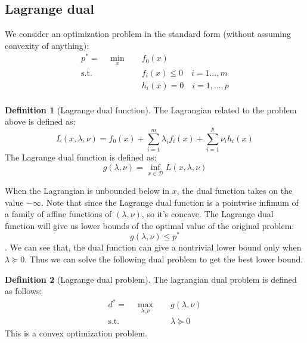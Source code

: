 \documentclass[
]{book}
\theoremstyle{definition}
\newtheorem{definition}{Definition}[chapter]
\theoremstyle{definition}
\theoremstyle{definition}
\theoremstyle{definition}
\theoremstyle{remark}
\begin{document}
\subsection{Lagrange dual}\label{lagrange-dual}

We consider an optimization problem in the standard form (without assuming convexity of anything):
\begin{equation}
\begin{aligned}
p^* = \quad \min_{x} \quad & f_0(x)\\
\textrm{s.t.} \quad & f_i(x)\leq 0\quad i=1...,m\\
  & h_i(x) = 0\quad i=1,...,p   \\
\end{aligned}
\end{equation}

\begin{definition}[Lagrange dual function]
\protect\hypertarget{def:defdualfunc}{}\label{def:defdualfunc}The Lagrangian related to the problem above is defined as: \[L(x,\lambda,\nu)=f_0(x)+\sum_{i=1}^m\lambda_if_i(x)+\sum_{i=1}^p\nu_ih_i(x)\]
The Lagrange dual function is defined as: \[g(\lambda,\nu) = \inf_{x\in\mathcal{D}}L(x,\lambda,\nu)\]
\end{definition}

When the Lagrangian is unbounded below in \(x\), the dual function takes on the value \(-\infty\). Note that since the Lagrange dual function is a pointwise infimum of a family of affine functions of \((\lambda,\nu)\), so it's concave. The Lagrange dual function will give us lower bounds of the optimal value of the original problem: \[g(\lambda,\nu)\leq p^*\]. We can see that, the dual function can give a nontrivial lower bound only when \(\lambda\succeq 0\). Thus we can solve the following dual problem to get the best lower bound.

\begin{definition}[Lagrange dual problem]
\protect\hypertarget{def:defdualprob}{}\label{def:defdualprob}The lagrangian dual problem is defined as follows:
\begin{equation}
  \begin{aligned}
  d^* = \quad \max_{\lambda,\nu} \quad & g(\lambda,\nu)\\
  \textrm{s.t.} \quad & \lambda\succeq 0
  \end{aligned}
  \end{equation}
This is a convex optimization problem.
\end{definition}
\end{document}
